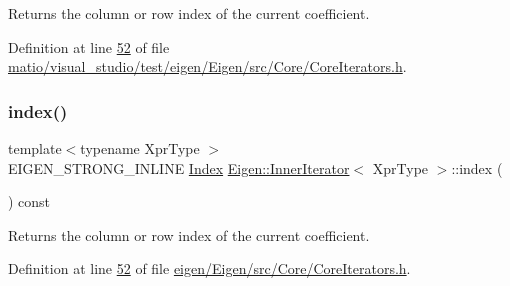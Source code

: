 \begin{DoxyReturn}{Returns}
the column or row index of the current coefficient. 
\end{DoxyReturn}


Definition at line \hyperlink{matio_2visual__studio_2test_2eigen_2_eigen_2src_2_core_2_core_iterators_8h_source_l00052}{52} of file \hyperlink{matio_2visual__studio_2test_2eigen_2_eigen_2src_2_core_2_core_iterators_8h_source}{matio/visual\+\_\+studio/test/eigen/\+Eigen/src/\+Core/\+Core\+Iterators.\+h}.

\mbox{\label{class_eigen_1_1_inner_iterator_ac9e0e40b8aceb192a0e1c7d656148760}} 
\subsubsection{\texorpdfstring{index()}{index()}\hspace{0.1cm}{\footnotesize\ttfamily [2/2]}}
{\footnotesize\ttfamily template$<$typename Xpr\+Type $>$ \\
E\+I\+G\+E\+N\+\_\+\+S\+T\+R\+O\+N\+G\+\_\+\+I\+N\+L\+I\+NE \hyperlink{namespace_eigen_a62e77e0933482dafde8fe197d9a2cfde}{Index} \hyperlink{class_eigen_1_1_inner_iterator}{Eigen\+::\+Inner\+Iterator}$<$ Xpr\+Type $>$\+::index (\begin{DoxyParamCaption}{ }\end{DoxyParamCaption}) const\hspace{0.3cm}{\ttfamily [inline]}}

\begin{DoxyReturn}{Returns}
the column or row index of the current coefficient. 
\end{DoxyReturn}


Definition at line \hyperlink{eigen_2_eigen_2src_2_core_2_core_iterators_8h_source_l00052}{52} of file \hyperlink{eigen_2_eigen_2src_2_core_2_core_iterators_8h_source}{eigen/\+Eigen/src/\+Core/\+Core\+Iterators.\+h}.

\mbox{\label{class_eigen_1_1_inner_iterator_a0f11df2dfcd1c48c54aa29e605c09310}} 
